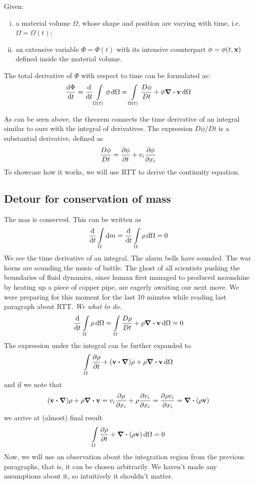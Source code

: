 \documentclass[justified, nobib]{tufte-handout}
\begin{document}
\begin{theorem}
	Given:
	\begin{enumerate}[(i)]
		\item a material volume \(\Omega\), whose shape and position are varying with time,
		      i.e.\ \(\Omega = \Omega(t)\);
		\item an extensive variable \(\Phi = \Phi(t)\) with its intensive counterpart
		      \(\phi = \phi(t, \vb{x})\)  defined inside the material volume.
	\end{enumerate}
	The total derivative of \(\Phi\) with respect to time can be formulated as:
	\begin{equation}
		\dv{\Phi}{t} = \dv{t} \int\limits_{\Omega(t)} \phi \dd{\Omega}
		= \int\limits_{\Omega(t)} \dfrac{D\phi}{Dt} + \phi \div{\vb{v}} \dd{\Omega}
	\end{equation}
\end{theorem}

As can be seen above, the theorem connects the time derivative of an integral
similar to ours with the integral of derivatives. The expression \(D\phi/Dt\)
is a substantial derivative, defined as
\[
	\dfrac{D\phi}{Dt} = \pdv{\phi}{t} + v_i\pdv{\phi}{x_i}
\]
To showcase how it works, we will use RTT to derive the continuity equation.

\subsection{Detour for conservation of mass}
The mas is conserved. This can be written as
\[
	\dv{t}\int\limits_\Omega \dd{m} =
	\dv{t}\int\limits_\Omega \rho\dd{\Omega} = 0
\]
We see the time derivative of an integral. The alarm bells have sounded.
The war horns are sounding the music of battle. The ghost of all scientists
pushing the boundaries of fluid dynamics, since human first managed to produced
moonshine by heating up a piece of copper pipe, are eagerly awaiting our next
move. We were preparing for this moment
for the last 10 minutes while reading last paragraph about RTT.
\emph{We what to do.}
\[
	\dv{t}\int\limits_\Omega \rho\dd{\Omega} =
	\int\limits_\Omega  \dfrac{D\rho}{Dt} + \rho\div{\vb{v}}\dd{\Omega}
	=  0
\]
The expression under the integral can be further expanded to
\[
	\int\limits_\Omega  \pdv{\rho}{t} + (\vb{v}\dotproduct\grad)\rho
	+ \rho\div{\vb{v}}\dd{\Omega}
\]
and if we note that
\[
	(\vb{v}\dotproduct\grad)\rho + \rho\div{\vb{v}} =
	v_i \pdv{\rho}{x_i} + \rho\pdv{v_i}{x_i} = \pdv{\rho v_i}{x_i}
	= \div{(\rho \vb{v})}
\]
we arrive at (almost) final result
\[
	\int\limits_\Omega  \pdv{\rho}{t} + \div{(\rho \vb{v})}\dd{\Omega} = 0
\]
Now, we will use an observation about the integration region from the
previous paragraphs, that is, it can be chosen arbitrarily. We haven't
made any assumptions about it, so intuitively it shouldn't matter.
\end{document}
